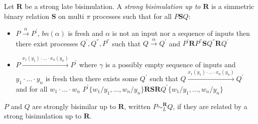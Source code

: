 \begin{definition}\label{strongLateBisimulationUpTo}
  Let $\mathbf{R}$ be a strong late bisimulation. A \emph{strong bisimulation up to $\mathbf{R}$} is a simmetric binary relation $\mathbf{S}$ on multi $\pi$ processes such that for all $P\mathbf{S}Q$:
   \begin{itemize}
     \item 
       $P \xrightarrow{\alpha} P^{'}$, $bn(\alpha)$ is fresh and $\alpha$ is not an input nor a sequence of inputs then there exist processes $Q^{'}, Q^{''}, P^{''}$ such that $Q \xrightarrow{\alpha} Q^{'}$ and $P^{'} \mathbf{R} P^{''} \mathbf{S} Q^{''} \mathbf{R} Q^{'}$
     \item
       $P \xrightarrow{x_{1}(y_{1}) \cdot \ldots \cdot x_{n}(y_{n})} P^{'}$ where $\gamma$ is a possibly empty sequence of inputs and $y_{1} \cdot \ldots \cdot y_{n}$ is fresh then there exists some $Q^{'}$ such that $Q \xrightarrow{x_{1}(y_{1}) \cdot \ldots \cdot x_{n}(y_{n})} Q^{'}$ and for all $w_{1}\cdot \ldots \cdot w_{n}$  $P^{'}\{w_{1}/y_{1}, \ldots, w_{n}/y_{n}\} \mathbf{R} \mathbf{S} \mathbf{R} Q^{'}\{w_{1}/y_{1}, \ldots, w_{n}/y_{n}\}$
  \end{itemize}
  $P$ and $Q$ are strongly bisimilar up to $\mathbf{R}$, written $P \sim_{L}^{\mathbf{R}} Q$, if they are related by a strong bisimulation up to $\mathbf{R}$.
\end{definition}


